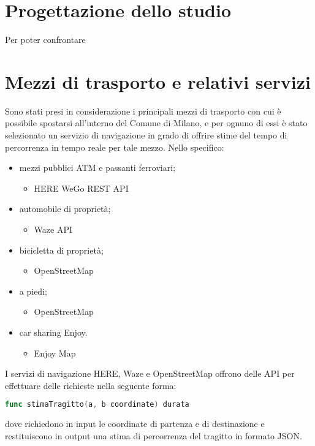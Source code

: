 \section{Progettazione dello studio}

Per poter confrontare 

\section{Mezzi di trasporto e relativi servizi}

Sono stati presi in considerazione i principali mezzi di trasporto con cui è possibile spostarsi all'interno del Comune di Milano, e per ognuno di essi è stato selezionato un servizio di navigazione in grado di offrire stime del tempo di percorrenza in tempo reale per tale mezzo. Nello specifico:

\begin{itemize}
	\item mezzi pubblici ATM e passanti ferroviari;
	\begin{itemize}
		\item HERE WeGo REST API\cite{herewegoapi}
	\end{itemize}
	\item automobile di proprietà;
	\begin{itemize}
		\item Waze API\cite{wazeapi}
	\end{itemize}
	\item bicicletta di proprietà;
	\begin{itemize}
		\item OpenStreetMap\cite{openstreetmap}
	\end{itemize}
	\item a piedi;
	\begin{itemize}
		\item OpenStreetMap\cite{openstreetmap}
	\end{itemize}
	\item car sharing Enjoy.
	\begin{itemize}
		\item Enjoy Map\cite{enjoycarsharing}
	\end{itemize}
\end{itemize}

I servizi di navigazione HERE, Waze e OpenStreetMap offrono delle API per effettuare delle richieste nella seguente forma:
\begin{lstlisting}[language=Go]
func stimaTragitto(a, b coordinate) durata
\end{lstlisting}
dove richiedono in input le coordinate di partenza e di destinazione e restituiscono in output una stima di percorrenza del tragitto in formato JSON.


